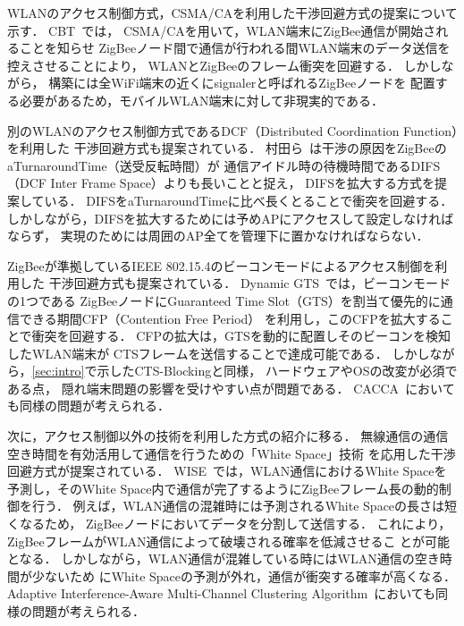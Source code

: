 \documentclass[technicalreport]{ieicej}
\begin{document}
WLANのアクセス制御方式，CSMA/CAを利用した干渉回避方式の提案について示す．
CBT~\cite{Zhang11:}では，
CSMA/CAを用いて，WLAN端末にZigBee通信が開始されることを知らせ
ZigBeeノード間で通信が行われる間WLAN端末のデータ送信を控えさせることにより，
WLANとZigBeeのフレーム衝突を回避する．
しかしながら，
構築には全WiFi端末の近くにsignalerと呼ばれるZigBeeノードを
配置する必要があるため，モバイルWLAN端末に対して非現実的である．

別のWLANのアクセス制御方式であるDCF（Distributed Coordination Function）を利用した
干渉回避方式も提案されている．
村田ら~\cite{Murata14:}は干渉の原因をZigBeeのaTurnaroundTime（送受反転時間）が
通信アイドル時の待機時間であるDIFS（DCF Inter Frame Space）よりも長いことと捉え，
DIFSを拡大する方式を提案している．
DIFSをaTurnaroundTimeに比べ長くとることで衝突を回避する．
しかしながら，DIFSを拡大するためには予めAPにアクセスして設定しなければならず，
実現のためには周囲のAP全てを管理下に置かなければならない．

ZigBeeが準拠しているIEEE 802.15.4のビーコンモードによるアクセス制御を利用した
干渉回避方式も提案されている．
Dynamic GTS~\cite{Huang09:}では，ビーコンモードの1つである
ZigBeeノードにGuaranteed Time Slot（GTS）を割当て優先的に通信できる期間CFP（Contention Free Period）
を利用し，このCFPを拡大することで衝突を回避する．
CFPの拡大は，GTSを動的に配置しそのビーコンを検知したWLAN端末が
CTSフレームを送信することで達成可能である．
しかしながら，\ref{sec:intro}で示したCTS-Blockingと同様，
ハードウェアやOSの改変が必須である点，
隠れ端末問題の影響を受けやすい点が問題である．
CACCA~\cite{Tytgat12:}においても同様の問題が考えられる．

次に，アクセス制御以外の技術を利用した方式の紹介に移る．
無線通信の通信空き時間を有効活用して通信を行うための「White Space」技術
を応用した干渉回避方式が提案されている．
WISE~\cite{Huang10:}では，WLAN通信におけるWhite Spaceを予測し，そのWhite
Space内で通信が完了するようにZigBeeフレーム長の動的制御を行う．
例えば，WLAN通信の混雑時には予測されるWhite Spaceの長さは短くなるため，
ZigBeeノードにおいてデータを分割して送信する．
これにより，ZigBeeフレームがWLAN通信によって破壊される確率を低減させるこ
とが可能となる．
しかしながら，WLAN通信が混雑している時にはWLAN通信の空き時間が少ないため
にWhite Spaceの予測が外れ，通信が衝突する確率が高くなる．
Adaptive Interference-Aware Multi-Channel
Clustering Algorithm~\cite{Kang07:}においても同様の問題が考えられる．
\end{document}
